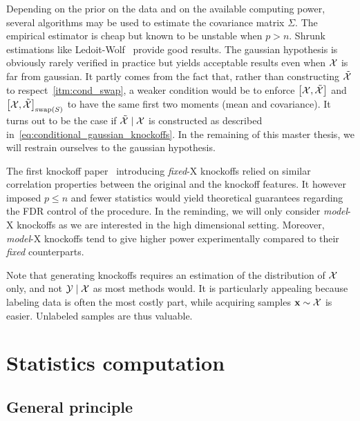 Depending on the prior on the data and on the available computing power,
several algorithms may be used to estimate the covariance matrix $\Sigma$.
The empirical estimator is cheap but known to be unstable when $p > n$.
Shrunk estimations like Ledoit-Wolf~\cite{ledoit_wolf} provide good results.
\bigbreak
The gaussian hypothesis is obviously rarely verified in practice but yields acceptable results even when
$\mathcal{X}$ is far from gaussian.
It partly comes from the fact that, rather than constructing $\tilde{\mathcal{X}}$ to respect~\ref{itm:cond_swap},
a weaker condition would be to enforce $\big[ \mathcal{X}, \tilde{\mathcal{X}} \big]$ and $\big[ \mathcal{X}, \tilde{\mathcal{X}} \big]_{\operatorname{swap}(S)}$ to have the
same first two moments (mean and covariance).
It turns out to be the case if $\tilde{\mathcal{X}} \mid \mathcal{X}$ is constructed as described in~\ref{eq:conditional_gaussian_knockoffs}.
In the remaining of this master thesis, we will restrain ourselves to the gaussian hypothesis.

The first knockoff paper~\citep{fixed_x_knockoffs} introducing \textit{fixed}-X knockoffs relied on similar correlation
properties between the original and the knockoff features.
It however imposed $p \leq n$ and fewer statistics would yield theoretical guarantees regarding the FDR control
of the procedure.
In the reminding, we will only consider \textit{model}-X knockoffs as we are interested in the high dimensional
setting.
Moreover, \textit{model}-X knockoffs tend to give higher power experimentally compared to their \textit{fixed}
counterparts.

Note that generating knockoffs requires an estimation of the distribution of $\mathcal{X}$ only,
and not $\mathcal{Y} \mid \mathcal{X}$ as most methods would.
It is particularly appealing because labeling data is often the most costly part,
while acquiring samples $\mathbf{x} \sim \mathcal{X}$ is easier.
Unlabeled samples are thus valuable.

\section{Statistics computation}\label{sec:ksc}

\subsection{General principle}\label{subsec:scg}

